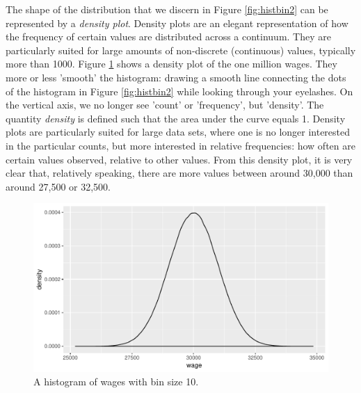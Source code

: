 \documentclass[]{book}\usepackage[]{graphicx}\usepackage[]{color}
\makeatletter
\def\maxwidth{ %
  \ifdim\Gin@nat@width>\linewidth
    \linewidth
  \else
    \Gin@nat@width
  \fi
}
\newenvironment{knitrout}{}{} %
\makeatother
\begin{document}
The shape of the distribution that we discern in Figure \ref{fig:histbin2} can be represented by a \textit{density plot}. Density plots are an elegant representation of how the frequency of certain values are distributed across a continuum. They are particularly suited for large amounts of non-discrete (continuous) values, typically more than 1000. Figure \ref{fig:densitywages} shows a density plot of the one million wages. They more or less 'smooth' the histogram: drawing a smooth line connecting the dots of the histogram in Figure \ref{fig:histbin2} while looking through your eyelashes. On the vertical axis, we no longer see 'count' or 'frequency', but 'density'. The quantity \textit{density} is defined such that the area under the curve equals 1. Density plots are particularly suited for large data sets, where one is no longer interested in the particular counts, but  more interested in relative frequencies: how often are certain values observed, relative to other values. From this density plot, it is very clear that, relatively speaking, there are more values between around 30,000 than around 27,500 or 32,500.

\begin{knitrout}
\color{fgcolor}\begin{figure}

{\centering \includegraphics[width=\maxwidth]{figure/densitywages-1} 

}

\caption[A histogram of wages with bin size 10]{A histogram of wages with bin size 10.}\label{fig:densitywages}
\end{figure}


\end{knitrout}
\end{document}
